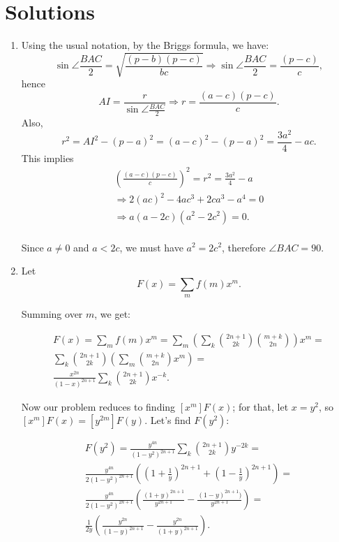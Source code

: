 \documentclass{article}
\begin{document}
\section{Solutions}
\label{sec:Solutions}

\begin{enumerate}

\item Using the usual notation, by the Briggs formula, we have: 
$$
	\sin \angle \frac{BAC}{2}=\sqrt{\frac{(p-b)(p-c)}{bc}}
	\Rightarrow \sin \angle \frac{BAC}{2}=\frac{(p-c)}{c},
$$
hence
$$
	AI=\frac{r}{\sin \angle \frac{BAC}{2}}
	\Rightarrow r=\frac{(a-c)(p-c)}{c}.
$$
Also,
$$
	r^2 = AI^2 - (p-a)^2 = (a-c)^2 - (p-a)^2 = \frac{3a^2}{4} - ac.
$$
This implies
\begin{eqnarray*}
\left(\frac{(a-c)(p-c)}{c}\right)^2 = r^2 = \frac{3a^2}{4} - a \\
\Rightarrow 2(ac)^2 - 4ac^3 + 2ca^3 - a^4 = 0 \\
\Rightarrow a(a-2c)(a^2-2c^2) = 0. \\
\end{eqnarray*}

Since $a\not=0$ and $a<2c$, we must have $a^2=2c^2$,
therefore $\angle BAC=90$.

\item Let
$$
	F(x) = \sum_{m} f(m)x^m.
$$

Summing over $m$, we get:

\begin{eqnarray*}
F(x) = \sum_{m}f(m) x^{m} = \sum_{m}\left(\sum_{k} \binom{2n + 1}{2k}\binom{m + k}{2n}\right) x^{m} = \\
\sum_{k} \binom{2n + 1}{2k} \left(\sum_{m}\binom{m + k}{2n} x^{m}\right) = \\
\frac{x^{2n}}{(1 - x)^{2n + 1}} \sum_{k}\binom{2n + 1}{2k}x^{-k}.
\end{eqnarray*}

Now our problem reduces to finding $[x^{m}]F(x)$; for that,
let $x = y^{2}$, so $[x^{m}]F(x) = [y^{2m}]F(y)$. Let's find $F(y^2)$:

\begin{eqnarray*}
F(y^2) = \frac{y^{4n}}{(1 - y^2)^{2n + 1}} \sum_{k} \binom{2n + 1}{2k}y^{-2k} = \\
\frac{y^{4n}}{2(1 - y^2)^{2n + 1}}\left( \left(1 + \frac{1}{y}\right)^{2n + 1} + \left(1 - \frac{1}{y}\right)^{2n + 1} \right) = \\
\frac{y^{4n}}{2(1 - y^2)^{2n + 1}}\left(\frac{(1 + y)^{2n + 1}}{y^{2n + 1}} - \frac{(1 - y)^{2n + 1})}{y^{2n + 1}} \right) = \\
\frac{1}{2y}\left(\frac{y^{2n}}{(1 - y)^{2n + 1}} - \frac{y^{2n}}{(1 + y)^{2n + 1}}\right).
\end{eqnarray*}


\end{enumerate}
\end{document}
